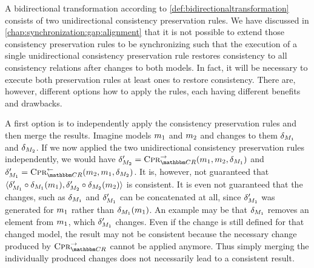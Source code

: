 A bidirectional transformation according to \autoref{def:bidirectionaltransformation} consists of two unidirectional consistency preservation rules.
We have discussed in \autoref{chap:synchronization:gap:alignment} that it is not possible to extend those consistency preservation rules to be synchronizing such that the execution of a single unidirectional consistency preservation rule restores consistency to all consistency relations after changes to both models.
In fact, it will be necessary to execute both preservation rules at least ones to restore consistency.
There are, however, different options how to apply the rules, each having different benefits and drawbacks.

A first option is to independently apply the consistency preservation rules and then merge the results.
Imagine models $m_{1}$ and $m_{2}$ and changes to them $\delta_{M_{1}}$ and $\delta_{M_{2}}$.
If we now applied the two unidirectional consistency preservation rules independently, we would have $\change{\metamodel{M}{2}}' = \consistencypreservationrule{\consistencyrelationset{CR}}^{\rightarrow}(\model{m}{1},\model{m}{2}, \change{\metamodel{M}{1}})$ and $\change{\metamodel{M}{1}}' = \consistencypreservationrule{\consistencyrelationset{CR}{}}^{\leftarrow}(\model{m}{2}, \model{m}{1}, \change{\metamodel{M}{2}})$.
It is, however, not guaranteed that $\langle \delta_{M_{1}}' \circ \delta_{M_{1}}(m_{1}), \delta_{M_{2}}' \circ \delta_{M_{2}}(m_{2}) \rangle$ is consistent.
It is even not guaranteed that the changes, such as $\delta_{M_{1}}$ and $\delta_{M_{1}}'$ can be concatenated at all, since $\delta_{M_{1}}'$ was generated for $m_{1}$ rather than $\delta_{M_{1}}(m_{1})$.
An example may be that $\delta_{M_{1}}$ removes an element from $m_{1}$, which $\delta_{M_{1}}'$ changes.
Even if the change is still defined for that changed model, the result may not be consistent because the necessary change produced by $\consistencypreservationrule{\consistencyrelationset{CR}}^{\rightarrow}$ cannot be applied anymore.
Thus simply merging the individually produced changes does not necessarily lead to a consistent result.

